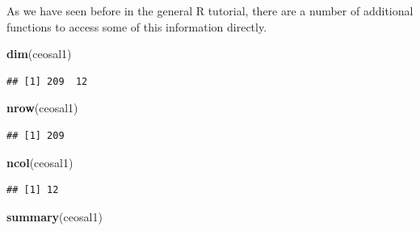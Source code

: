 \documentclass[]{book}
\newenvironment{Shaded}{\begin{snugshade}}{\end{snugshade}}
\newcommand{\KeywordTok}[1]{\textcolor[rgb]{0.13,0.29,0.53}{\textbf{#1}}}
\newcommand{\NormalTok}[1]{#1}
\begin{document}
As we have seen before in the general R tutorial, there are a number of
additional functions to access some of this information directly.

\begin{Shaded}
\begin{Highlighting}[]
\KeywordTok{dim}\NormalTok{(ceosal1)}
\end{Highlighting}
\end{Shaded}

\begin{verbatim}
## [1] 209  12
\end{verbatim}

\begin{Shaded}
\begin{Highlighting}[]
\KeywordTok{nrow}\NormalTok{(ceosal1)}
\end{Highlighting}
\end{Shaded}

\begin{verbatim}
## [1] 209
\end{verbatim}

\begin{Shaded}
\begin{Highlighting}[]
\KeywordTok{ncol}\NormalTok{(ceosal1)}
\end{Highlighting}
\end{Shaded}

\begin{verbatim}
## [1] 12
\end{verbatim}

\begin{Shaded}
\begin{Highlighting}[]
\KeywordTok{summary}\NormalTok{(ceosal1)}
\end{Highlighting}
\end{Shaded}
\end{document}
